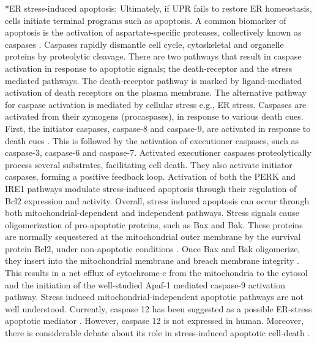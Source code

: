 \documentclass[12pt]{article}
\makeatletter
\renewcommand\subsection{\@startsection
	{subsection}{2}{0mm}
	{-0.05in}
	{-0.5\baselineskip}
	{\normalfont\normalsize\bfseries}}
\makeatother
\begin{document}
\subsection*{ER stress-induced apoptosis:} Ultimately, if UPR fails to restore ER homeostasis, cells initiate terminal programs such as apoptosis. A common biomarker of apoptosis is the activation of aspartate-specific proteases, collectively known as caspases \citep{alnemri1996hic}. Caspases rapidly dismantle cell cycle, cytoskeletal and organelle proteins by proteolytic cleavage. There are two pathways that result in caspase activation in response to apoptotic signals; the death-receptor and the stress mediated pathways. The death-receptor pathway is marked by ligand-mediated activation of death receptors on the plasma membrane. The alternative pathway for caspase activation is mediated by cellular stress e.g., ER stress. Caspases are activated from their zymogens (procaspases), in response to various death cues. First, the initiator caspases, caspase-8 and caspase-9, are activated in response to death cues \citep{muzio1998ipm}. This is followed by the activation of executioner caspases, such as caspase-3, caspase-6 and caspase-7. Activated executioner caspases proteolytically process several substrates, facilitating cell death. They also activate initiator caspases, forming a positive feedback loop. Activation of both the PERK and IRE1 pathways modulate stress-induced apoptosis through their regulation of Bcl2 expression and activity. Overall, stress induced apoptosis can occur through both mitochondrial-dependent and independent pathways. Stress signals cause oligomerization of pro-apoptotic proteins, such as Bax and Bak. These proteins are normally sequestered at the mitochondrial outer membrane by the survival protein Bcl2, under non-apoptotic conditions \citep{wei2001proapoptotic}. Once Bax and Bak oligomerize, they insert into the mitochondrial membrane and breach membrane integrity \citep{nechushtan1999conformation}. This results in a net efflux of cytochrome-c from the mitochondria to the cytosol and the initiation of the well-studied Apaf-1 mediated caspase-9 activation pathway. Stress induced mitochondrial-independent apoptotic pathways are not well understood. Currently, caspase 12 has been suggested as a possible ER-stress apoptotic mediator \citep{szegezdi2006mediators, yoneda2001ace, nakagawa2000caspase}. However, caspase 12 is not expressed in human. Moreover, there is considerable debate about its role in stress-induced apoptotic cell-death \citep{Saleh:2006ys}.  


\clearpage
% 


\end{document}
